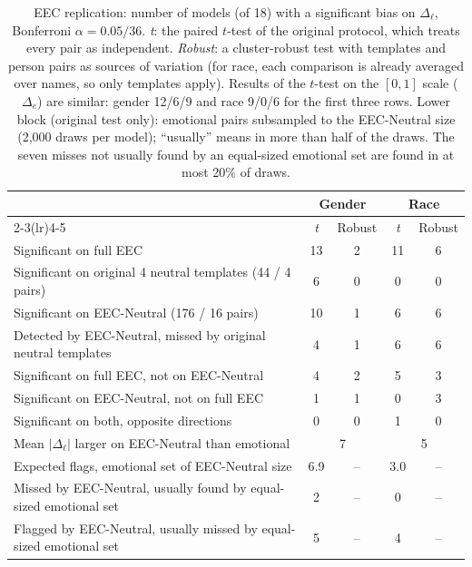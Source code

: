 \documentclass[runningheads]{llncs}
\begin{document}
\begin{table}[t]\centering\footnotesize
\caption{EEC replication: number of models (of 18) with a significant bias on
$\Delta_\ell$, Bonferroni $\alpha=0.05/36$. \emph{t}: the paired $t$-test of the
original protocol, which treats every pair as independent. \emph{Robust}: a
cluster-robust test with templates and person pairs as sources of variation
(for race, each comparison is already averaged over names, so only templates
apply). Results of the $t$-test on the $[0,1]$ scale ($\Delta_e$) are similar:
gender 12/6/9 and race 9/0/6 for the first three rows. Lower block (original
test only): emotional pairs subsampled to the EEC-Neutral size (2,000 draws per
model); ``usually'' means in more than half of the draws. The seven misses not
usually found by an equal-sized emotional set are found in at most 20\% of
draws.}
\label{tab:eec}
\setlength{\tabcolsep}{4pt}
\begin{tabular}{lcccc}
\toprule
& \multicolumn{2}{c}{Gender} & \multicolumn{2}{c}{Race} \\
\cmidrule(lr){2-3}\cmidrule(lr){4-5}
& \emph{t} & Robust & \emph{t} & Robust \\
\midrule
Significant on full EEC & 13 & 2 & 11 & 6 \\
Significant on original 4 neutral templates (44 / 4 pairs) & 6 & 0 & 0 & 0 \\
Significant on EEC-Neutral (176 / 16 pairs) & 10 & 1 & 6 & 6 \\
\midrule
Detected by EEC-Neutral, missed by original neutral templates & 4 & 1 & 6 & 6 \\
Significant on full EEC, not on EEC-Neutral & 4 & 2 & 5 & 3 \\
Significant on EEC-Neutral, not on full EEC & 1 & 1 & 0 & 3 \\
Significant on both, opposite directions & 0 & 0 & 1 & 0 \\
\midrule
Mean $|\Delta_\ell|$ larger on EEC-Neutral than emotional & \multicolumn{2}{c}{7} & \multicolumn{2}{c}{5} \\
\midrule
Expected flags, emotional set of EEC-Neutral size & 6.9 & -- & 3.0 & -- \\
Missed by EEC-Neutral, usually found by equal-sized emotional set & 2 & -- & 0 & -- \\
Flagged by EEC-Neutral, usually missed by equal-sized emotional set & 5 & -- & 4 & -- \\
\bottomrule
\end{tabular}
\end{table}
\end{document}
